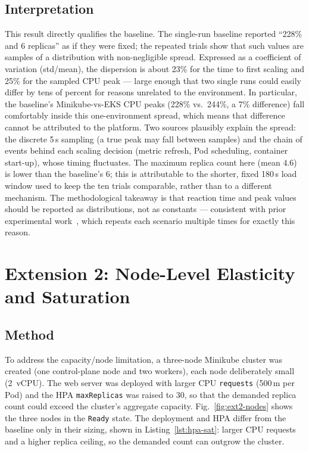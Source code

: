 \documentclass[conference]{IEEEtran}
\begin{document}
\subsection{Interpretation}
This result directly qualifies the baseline. The single-run baseline reported
``228\% and 6 replicas'' as if they were fixed; the repeated trials show that
such values are samples of a distribution with non-negligible spread. Expressed as
a coefficient of variation (std/mean), the dispersion is about 23\% for the time
to first scaling and 25\% for the sampled CPU peak --- large enough that two
single runs could easily differ by tens of percent for reasons unrelated to the
environment. In particular, the baseline's Minikube-vs-EKS CPU peaks (228\% vs.\
244\%, a 7\% difference) fall comfortably inside this one-environment spread,
which means that difference cannot be attributed to the platform.
Two sources plausibly explain the spread: the discrete 5\,s sampling (a true peak
may fall between samples) and the chain of events behind each scaling decision
(metric refresh, Pod scheduling, container start-up), whose timing fluctuates. The
maximum replica count here (mean $4.6$) is lower than the baseline's 6; this is
attributable to the shorter, fixed 180\,s load window used to keep the ten trials
comparable, rather than to a different mechanism. The methodological takeaway is
that reaction time and peak values should be reported as distributions, not as
constants --- consistent with prior experimental work~\cite{nguyen2020}, which
repeats each scenario multiple times for exactly this reason.

\section{Extension 2: Node-Level Elasticity and Saturation}
\label{sec:ext2}
\subsection{Method}
To address the capacity/node limitation, a three-node Minikube cluster was
created (one control-plane node and two workers), each node deliberately small
(2~vCPU). The web server was deployed with larger CPU \texttt{requests} (500\,m
per Pod) and the HPA \texttt{maxReplicas} was raised to 30, so that the demanded
replica count could exceed the cluster's aggregate capacity.
Fig.~\ref{fig:ext2-nodes} shows the three nodes in the \texttt{Ready} state. The
deployment and HPA differ from the baseline only in their sizing, shown in
Listing~\ref{lst:hpa-sat}: larger CPU requests and a higher replica ceiling, so
the demanded count can outgrow the cluster.
\end{document}
